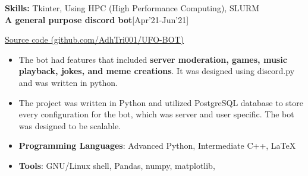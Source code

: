 \textbf{Skills:} Tkinter, Using HPC (High Performance Computing), SLURM
\\


\textbf{A general purpose discord bot}\hfill {[Apr'21-Jun'21]}

\hfill \href{https://github.com/AdhTri001/UFO-BOT}
    {Source code (github.com/AdhTri001/UFO-BOT)}

\begin{itemize}
    \item The bot had features that included
    \textbf{ server moderation, games, music playback, jokes, and meme creations}.
    It was designed using discord.py and was written in python.
    \item The project was written in Python and utilized PostgreSQL database to store every configuration for the bot,
    which was server and user specific. The bot was designed to be scalable.
\end{itemize}


\newpage
{}
 \begin{itemize}
\setlength\itemsep{-0.45cm}
    \item \textbf{Programming Languages}: Advanced Python, Intermediate C++, \LaTeX\\
    \item \textbf{Tools}: GNU/Linux shell, Pandas, numpy, matplotlib, \\
\end{itemize}